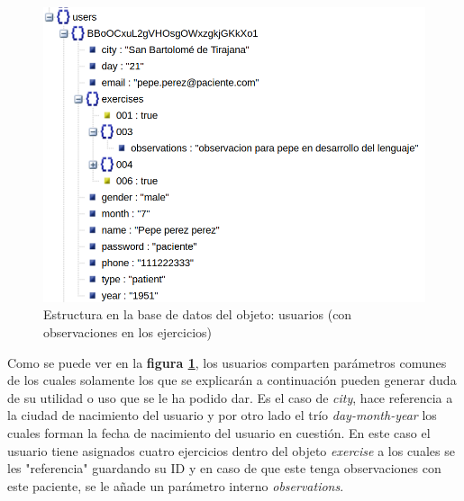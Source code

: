 \medskip
\begin{figure}
    \includegraphics[width=\linewidth]{./images/database/users-patient-with-observations-database.png}
    \caption{Estructura en la base de datos del objeto: usuarios (con observaciones en los ejercicios)}
    \label{usuario-con-observaciones}
\end{figure}

Como se puede ver en la \textbf{figura \ref{usuario-con-observaciones}},
los usuarios comparten parámetros comunes de los cuales solamente los que
se explicarán a continuación pueden generar duda de su utilidad o uso que se
le ha podido dar. Es el caso de \textit{city}, hace referencia a la ciudad de
nacimiento del usuario y por otro lado el trío \textit{day-month-year} los
cuales forman la fecha de nacimiento del usuario en cuestión.
En este caso el usuario tiene asignados cuatro ejercicios dentro del objeto
\textit{exercise} a los cuales se les "referencia" guardando su ID y en caso
de que este tenga observaciones con este paciente, se le añade un parámetro
interno \textit{observations}.


